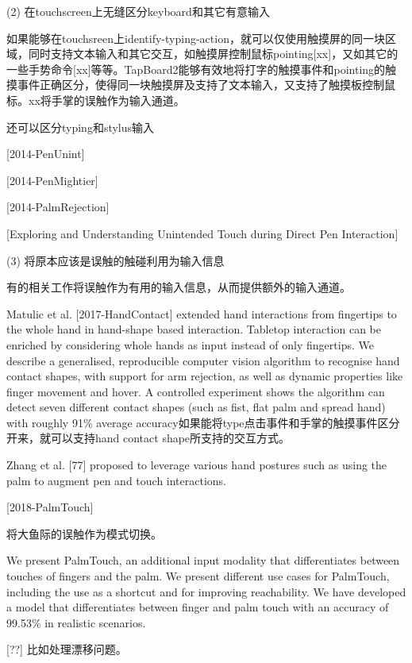 (2) 在touchscreen上无缝区分keyboard和其它有意输入

如果能够在touchsreen上identify-typing-action，就可以仅使用触摸屏的同一块区域，同时支持文本输入和其它交互，如触摸屏控制鼠标pointing[xx]，又如其它的一些手势命令[xx]等等。TapBoard2能够有效地将打字的触摸事件和pointing的触摸事件正确区分，使得同一块触摸屏及支持了文本输入，又支持了触摸板控制鼠标。xx将手掌的误触作为输入通道。

还可以区分typing和stylus输入

[2014-PenUnint]

[2014-PenMightier]

[2014-PalmRejection]

[Exploring and Understanding Unintended Touch during Direct Pen Interaction]

(3) 将原本应该是误触的触碰利用为输入信息

有的相关工作将误触作为有用的输入信息，从而提供额外的输入通道。

Matulic et al. [2017-HandContact] extended hand interactions from fingertips to the whole hand in hand-shape based interaction. Tabletop interaction can be enriched by considering whole hands as input instead of only fingertips. We describe a
generalised, reproducible computer vision algorithm to recognise hand contact shapes, with support for arm rejection, as well as dynamic properties like finger movement
and hover. A controlled experiment shows the algorithm can detect seven different contact shapes (such as fist, flat palm and spread hand) with roughly 91\% average accuracy如果能将type点击事件和手掌的触摸事件区分开来，就可以支持hand contact shape所支持的交互方式。

Zhang et al. [77] proposed to leverage various hand postures such as using the palm to augment pen and touch interactions.

[2018-PalmTouch]

将大鱼际的误触作为模式切换。

We present PalmTouch, an additional input modality that differentiates between touches of fingers and the palm. We present different use cases for PalmTouch, including the
use as a shortcut and for improving reachability.  We have developed a model that differentiates between finger and palm touch with an accuracy of 99.53\% in realistic scenarios.

[??] 比如处理漂移问题。

